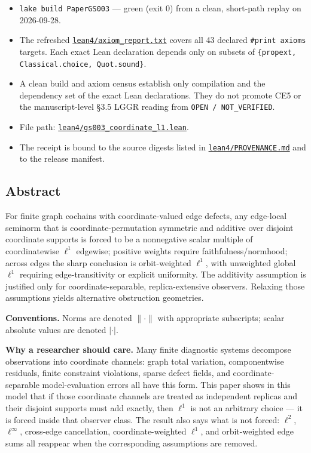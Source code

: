 \documentclass[
  11pt,
]{article}
\providecommand{\tightlist}{%
  \setlength{\itemsep}{0pt}\setlength{\parskip}{0pt}}
\providecommand{\tightlist}{%
  \setlength{\itemsep}{0pt}\setlength{\parskip}{0pt}}
\begin{document}
\begin{itemize}
\tightlist
\item
  \texttt{lake build PaperGS003} --- green (exit 0) from a clean,
  short-path replay on 2026-09-28.
\item
  The refreshed
  \href{lean4/axiom_report.txt}{\texttt{lean4/\allowbreak{}axiom\_\allowbreak{}report.txt}}
  covers all 43 declared \texttt{\#print axioms} targets. Each exact
  Lean declaration depends only on subsets of
  \texttt{\{propext, Classical.choice, Quot.sound\}}.
\item
  A clean build and axiom census establish only compilation and the
  dependency set of the exact Lean declarations. They do not promote CE5
  or the manuscript-level §3.5 LGGR reading from
  \texttt{OPEN /\allowbreak{} NOT\_\allowbreak{}VERIFIED}.
\item
  File path:
  \href{lean4/gs003_coordinate_l1.lean}{\texttt{lean4/\allowbreak{}gs003\_\allowbreak{}coordinate\_\allowbreak{}l1.lean}}.
\item
  The receipt is bound to the source digests listed in
  \href{lean4/PROVENANCE.md}{\texttt{lean4/\allowbreak{}PROVENANCE.md}}
  and to the release manifest.
\end{itemize}

\hypertarget{abstract}{%
\subsection{Abstract}\label{abstract}}

For finite graph cochains with coordinate-valued edge defects, any
edge-local seminorm that is coordinate-permutation symmetric and
additive over disjoint coordinate supports is forced to be a nonnegative
scalar multiple of coordinatewise \(\ell^1\) edgewise; positive weights
require faithfulness/normhood; across edges the sharp conclusion is
orbit-weighted \(\ell^1\), with unweighted global \(\ell^1\) requiring
edge-transitivity or explicit uniformity. The additivity assumption is
justified only for coordinate-separable, replica-extensive observers.
Relaxing those assumptions yields alternative obstruction geometries.

\textbf{Conventions.} Norms are denoted \(\lVert \cdot \rVert\) with
appropriate subscripts; scalar absolute values are denoted \(|\cdot|\).

\textbf{Why a researcher should care.} Many finite diagnostic systems
decompose observations into coordinate channels: graph total variation,
componentwise residuals, finite constraint violations, sparse defect
fields, and coordinate-separable model-evaluation errors all have this
form. This paper shows in this model that if those coordinate channels
are treated as independent replicas and their disjoint supports must add
exactly, then \(\ell^1\) is not an arbitrary choice --- it is forced
inside that observer class. The result also says what is not forced:
\(\ell^2\), \(\ell^\infty\), cross-edge cancellation,
coordinate-weighted \(\ell^1\), and orbit-weighted edge sums all
reappear when the corresponding assumptions are removed.
\end{document}
